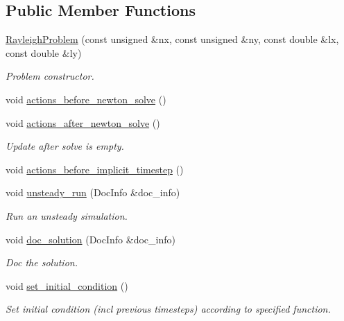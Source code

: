 \subsection*{Public Member Functions}
\begin{DoxyCompactItemize}
\item 
\hyperlink{classRayleighProblem_a53aeda7918553889b3fa0dd70cdb30f1}{Rayleigh\+Problem} (const unsigned \&nx, const unsigned \&ny, const double \&lx, const double \&ly)
\begin{DoxyCompactList}\small\item\em Problem constructor. \end{DoxyCompactList}\item 
void \hyperlink{classRayleighProblem_ab49bdf4a3c9fcb57fa04db8892875668}{actions\+\_\+before\+\_\+newton\+\_\+solve} ()
\item 
void \hyperlink{classRayleighProblem_a833938f3e1b592571729b2bbea3bb9d2}{actions\+\_\+after\+\_\+newton\+\_\+solve} ()
\begin{DoxyCompactList}\small\item\em Update after solve is empty. \end{DoxyCompactList}\item 
void \hyperlink{classRayleighProblem_a873a81442a28c7616fbe616d9068f8b9}{actions\+\_\+before\+\_\+implicit\+\_\+timestep} ()
\item 
void \hyperlink{classRayleighProblem_a7404085b8be8865ffc07fd4133e40151}{unsteady\+\_\+run} (Doc\+Info \&doc\+\_\+info)
\begin{DoxyCompactList}\small\item\em Run an unsteady simulation. \end{DoxyCompactList}\item 
void \hyperlink{classRayleighProblem_aca1b0f4134bc745c75ae524450e97109}{doc\+\_\+solution} (Doc\+Info \&doc\+\_\+info)
\begin{DoxyCompactList}\small\item\em Doc the solution. \end{DoxyCompactList}\item 
void \hyperlink{classRayleighProblem_a5c54c02c45c656cabbe8f8808e2cfd6b}{set\+\_\+initial\+\_\+condition} ()
\begin{DoxyCompactList}\small\item\em Set initial condition (incl previous timesteps) according to specified function. \end{DoxyCompactList}\end{DoxyCompactItemize}
